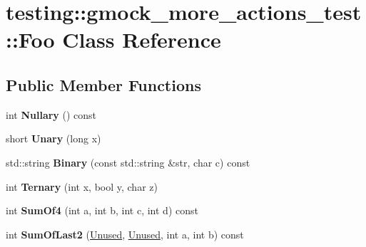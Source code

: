 \hypertarget{classtesting_1_1gmock__more__actions__test_1_1Foo}{}\section{testing\+:\+:gmock\+\_\+more\+\_\+actions\+\_\+test\+:\+:Foo Class Reference}
\label{classtesting_1_1gmock__more__actions__test_1_1Foo}
\subsection*{Public Member Functions}
\begin{DoxyCompactItemize}
\item 
\mbox{\label{classtesting_1_1gmock__more__actions__test_1_1Foo_ad6ba38dbb9b1594ac178630f07c4baa5}} 
int {\bfseries Nullary} () const
\item 
\mbox{\label{classtesting_1_1gmock__more__actions__test_1_1Foo_a68d2b46d6cc7d51979b0254940af6090}} 
short {\bfseries Unary} (long x)
\item 
\mbox{\label{classtesting_1_1gmock__more__actions__test_1_1Foo_a8ee56742c6c025af680617464c71ecef}} 
std\+::string {\bfseries Binary} (const std\+::string \&str, char c) const
\item 
\mbox{\label{classtesting_1_1gmock__more__actions__test_1_1Foo_afc5b86988210ad598fa3a2a9822297e4}} 
int {\bfseries Ternary} (int x, bool y, char z)
\item 
\mbox{\label{classtesting_1_1gmock__more__actions__test_1_1Foo_a69ca68e84528904032bad9533a23fb0a}} 
int {\bfseries Sum\+Of4} (int a, int b, int c, int d) const
\item 
\mbox{\label{classtesting_1_1gmock__more__actions__test_1_1Foo_abc041eb7a8e8211656495f2540f315ec}} 
int {\bfseries Sum\+Of\+Last2} (\mbox{\hyperlink{classtesting_1_1internal_1_1IgnoredValue}{Unused}}, \mbox{\hyperlink{classtesting_1_1internal_1_1IgnoredValue}{Unused}}, int a, int b) const

\end{DoxyCompactItemize}
